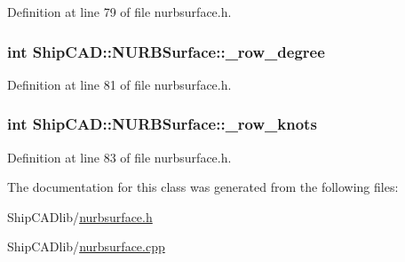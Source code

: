 Definition at line 79 of file nurbsurface.\+h.

\subsubsection[{\texorpdfstring{\+\_\+row\+\_\+degree}{_row_degree}}]{\setlength{\rightskip}{0pt plus 5cm}int Ship\+C\+A\+D\+::\+N\+U\+R\+B\+Surface\+::\+\_\+row\+\_\+degree\hspace{0.3cm}{\ttfamily [protected]}}\hypertarget{classShipCAD_1_1NURBSurface_a0c53705ad7cc3004e60398f38909f59e}{}\label{classShipCAD_1_1NURBSurface_a0c53705ad7cc3004e60398f38909f59e}


Definition at line 81 of file nurbsurface.\+h.

\subsubsection[{\texorpdfstring{\+\_\+row\+\_\+knots}{_row_knots}}]{\setlength{\rightskip}{0pt plus 5cm}int Ship\+C\+A\+D\+::\+N\+U\+R\+B\+Surface\+::\+\_\+row\+\_\+knots\hspace{0.3cm}{\ttfamily [protected]}}\hypertarget{classShipCAD_1_1NURBSurface_a3799680ea0e67d5d6c1a694f378e70ed}{}\label{classShipCAD_1_1NURBSurface_a3799680ea0e67d5d6c1a694f378e70ed}


Definition at line 83 of file nurbsurface.\+h.



The documentation for this class was generated from the following files\+:\begin{DoxyCompactItemize}
\item 
Ship\+C\+A\+Dlib/\hyperlink{nurbsurface_8h}{nurbsurface.\+h}\item 
Ship\+C\+A\+Dlib/\hyperlink{nurbsurface_8cpp}{nurbsurface.\+cpp}\end{DoxyCompactItemize}
